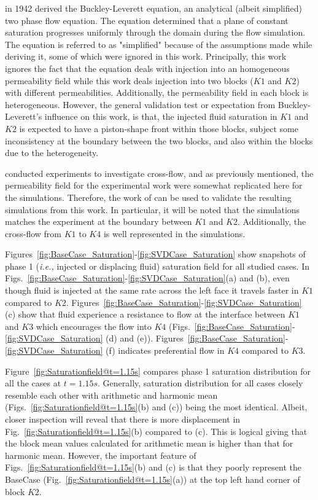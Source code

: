 \documentclass[preprint,12pt]{elsarticle}
\newcommand{\ie}{{\it i.e., }}
\begin{document}
\citet{buckley_1942} in 1942 derived the Buckley-Leverett equation, an analytical (albeit simplified) two phase flow equation. The equation determined that a plane of constant saturation progresses uniformly through the domain during the flow simulation. The equation is referred to as "simplified" because of the assumptions made while deriving it, some of which were ignored in this work. Principally, this work ignores the fact that the equation deals with injection into an homogeneous permeability field while this work deals injection into two blocks ($K1$ and $K2$) with different permeabilities. Additionally, the permeability field in each block is heterogeneous. However, the general validation test or expectation from Buckley-Leverett's influence on this work, is that, the injected fluid saturation in $K1$ and $K2$ is expected to have a piston-shape front within those blocks, subject some inconsistency at the boundary between the two blocks, and also within the blocks due to the heterogeneity.

\citet{dawe_2008} conducted experiments to investigate cross-flow, and as previously mentioned, the permeability field for the experimental work were somewhat replicated here for the simulations. Therefore, the work of \citet{dawe_2008} can be used to validate the resulting simulations from this work. In particular, it will be noted that the simulations matches the experiment at the boundary between $K1$ and $K2$. Additionally, the cross-flow from $K1$ to $K4$ is well represented in the simulations.

Figures~\ref{fig:BaseCase_Saturation}-\ref{fig:SVDCase_Saturation} show snapshots of phase 1 (\ie injected or displacing fluid) saturation field for all studied cases. In Figs.~\ref{fig:BaseCase_Saturation}-\ref{fig:SVDCase_Saturation}(a) and (b), even though fluid is injected at the same rate across the left face it travels faster in $K1$ compared to $K2$. Figures~\ref{fig:BaseCase_Saturation}-\ref{fig:SVDCase_Saturation} (c) show that fluid experience a resistance to flow at the interface between $K1$ and $K3$ which encourages the flow into $K4$ (Figs.~\ref{fig:BaseCase_Saturation}-\ref{fig:SVDCase_Saturation} (d) and (e)). Figures~\ref{fig:BaseCase_Saturation}-\ref{fig:SVDCase_Saturation} (f) indicates preferential flow in $K4$ compared to $K3$.

Figure~\ref{fig:Saturationfield@t=1.15s} compares phase 1 saturation distribution for all the cases at $t=1.15s$. Generally, saturation distribution for all cases closely resemble each other with arithmetic and harmonic mean (Figs.~\ref{fig:Saturationfield@t=1.15s}(b) and (c)) being the most identical. Albeit, closer inspection will reveal that there is more displacement in Fig.~\ref{fig:Saturationfield@t=1.15s}(b) compared to (c). This is logical giving that the block mean values calculated for arithmetic mean is higher than that for harmonic mean. However, the important feature of Figs.~\ref{fig:Saturationfield@t=1.15s}(b) and (c) is that they poorly represent the BaseCase (Fig.~\ref{fig:Saturationfield@t=1.15s}(a)) at the top left hand corner of block $K2$.
\end{document}
